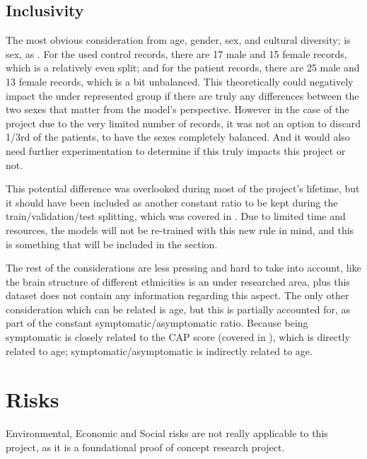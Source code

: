 \subsection{Inclusivity}
\label{sec:inclusive}

The most obvious consideration from age, gender, sex, and cultural diversity; is sex, as . For the used control records, there are 17 male and 15 female records, which is a relatively even split; and for the patient records, there are 25 male and 13 female records, which is a bit unbalanced. This theoretically could negatively impact the under represented group if there are truly any differences between the two sexes that matter from the model's perspective. However in the case of the project due to the very limited number of records, it was not an option to discard 1/3rd of the patients, to have the sexes completely balanced. And it would also need further experimentation to determine if this truly impacts this project or not.\par
This potential difference was overlooked during most of the project's lifetime, but it should have been included as another constant ratio to be kept during the train/validation/test splitting, which was covered in . Due to limited time and resources, the models will not be re-trained with this new rule in mind, and this is something that will be included in the   section.\par
The rest of the considerations are less pressing and hard to take into account, like the brain structure of different ethnicities is an under researched area, plus this dataset does not contain any information regarding this aspect. The only other consideration which can be related is age, but this is partially accounted for, as part of the constant symptomatic/asymptomatic ratio. Because being symptomatic is closely related to the \ac{CAP} score (covered in ), which is directly related to age; symptomatic/asymptomatic is indirectly related to age.

\section{Risks}

Environmental, Economic and Social risks are not really applicable to this project, as it is a foundational proof of concept research project.








